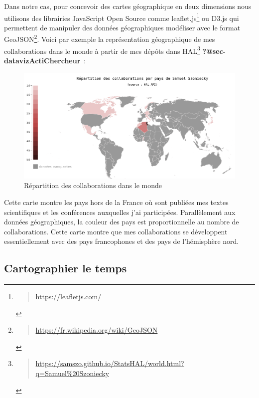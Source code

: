 \documentclass[
  letterpaper,
  DIV=11,
  numbers=noendperiod]{scrreprt}
\begin{document}
Dans notre cas, pour concevoir des cartes géographique en deux
dimensions nous utilisons des librairies JavaScript Open Source comme
leaflet.js\footnote{\begin{quote}
  \url{https://leafletjs.com/}
  \end{quote}} ou D3.js qui permettent de manipuler des données
géographiques modéliser avec le format GeoJSON\footnote{\begin{quote}
  \url{https://fr.wikipedia.org/wiki/GeoJSON}
  \end{quote}}. Voici par exemple la représentation géographique de mes
collaborations dans le monde à partir de mes dépôts dans HAL\footnote{\begin{quote}
  \url{https://samszo.github.io/StatsHAL/world.html?q=Samuel\%20Szoniecky}
  \end{quote}} \textbf{?@sec-datavizActiChercheur}~:

\begin{figure}

{\centering \includegraphics{media/1000000100000391000001C9A8374D4BE530A8B5.png}

}

\caption{\label{fig-collabMondeSamszo}Répartition des collaborations
dans le monde}

\end{figure}

Cette carte montre les pays hors de la France où sont publiées mes
textes scientifiques et les conférences auxquelles j'ai participées.
Parallèlement aux données géographiques, la couleur des pays est
proportionnelle au nombre de collaborations. Cette carte montre que mes
collaborations se développent essentiellement avec des pays francophones
et des pays de l'hémisphère nord.

\hypertarget{sec-cartoTempo}{%
\subsection{Cartographier le temps}\label{sec-cartoTempo}}
\end{document}
